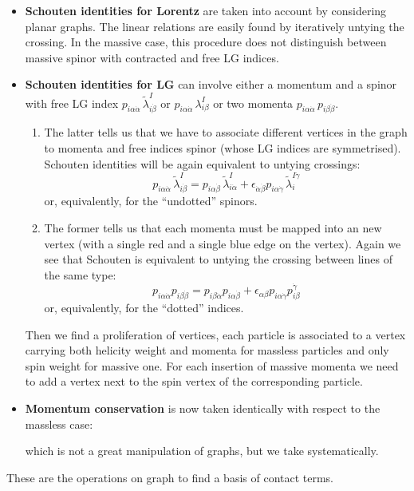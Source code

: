 \documentclass[aps,prd,nofootinbib,twocolumn,10pt]{revtex4-2}
\begin{document}
\begin{itemize}
	\item \textbf{Schouten identities for Lorentz} are taken into account by considering planar graphs. The linear relations are easily found by iteratively untying the crossing. In the massive case, this procedure does not distinguish between massive spinor with contracted and free LG indices.
	\item \textbf{Schouten identities for LG} can involve either a momentum and a spinor with free LG index $p_{i \alpha \dot{\alpha}}\, \widetilde{\lambda}^I_{i \dot{\beta}}$ or $p_{i \alpha \dot{\alpha}}\, \lambda^I_{i \beta}$ or two momenta $p_{i \alpha \dot{\alpha}}\, p_{i \beta \dot{\beta}}$.
	\begin{enumerate}
		\item The latter tells us that we have to associate different vertices in the graph to momenta and free indices spinor (whose LG indices are symmetrised). Schouten identities will be again equivalent to untying crossings:
		\begin{equation}
			p_{i \alpha \dot{\alpha}}\, \widetilde{\lambda}^I_{i \dot{\beta}} = p_{i \alpha \dot{\beta}}\, \widetilde{\lambda}^I_{i \dot{\alpha}} + \epsilon_{\dot{\alpha} \dot{\beta}} p_{i \alpha \dot{\gamma}}\, \widetilde{\lambda}^{I \dot{\gamma}}_{i}
		\end{equation}
		or, equivalently, for the “undotted” spinors.
		\item The former tells us that each momenta must be mapped into an new vertex (with a single red and a single blue edge on the vertex). Again we see that Schouten is equivalent to untying the crossing between lines of the same type:
		\begin{equation}
			p_{i \alpha \dot{\alpha}} p_{i \beta \dot{\beta}} = p_{i \beta \dot{\alpha}} p_{i \alpha \dot{\beta}} + \epsilon_{\alpha \beta} p_{i \alpha \dot{\gamma}} p_{i \beta}^{\dot{\gamma}}
		\end{equation}
		or, equivalently, for the “dotted” indices.
	\end{enumerate}
	Then we ﬁnd a proliferation of vertices, each particle is associated to a vertex carrying both helicity weight and momenta for massless particles and only spin weight for massive one. For each insertion of massive momenta we need to add a vertex next to the spin vertex of the corresponding particle.
	\item \textbf{Momentum conservation} is now taken identically with respect to the massless case:
	
	which is not a great manipulation of graphs, but we take systematically.
\end{itemize}
These are the operations on graph to ﬁnd a basis of contact terms.
\end{document}
